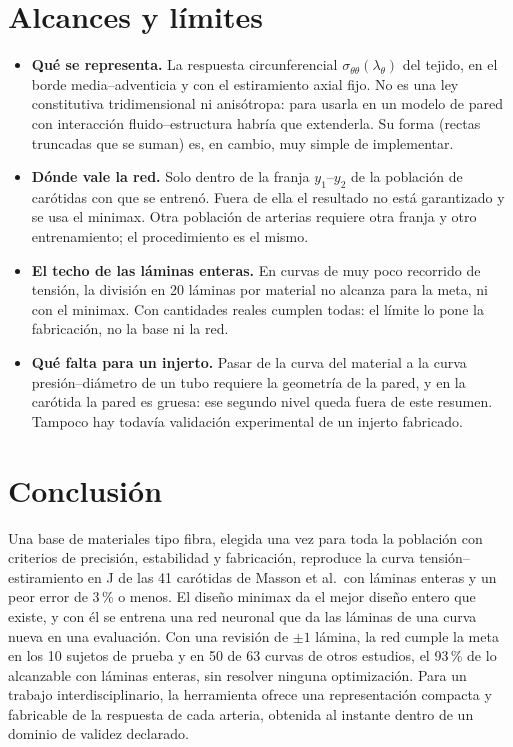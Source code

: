\section{Alcances y límites}
\begin{itemize}
\item \textbf{Qué se representa.} La respuesta circunferencial $\sigma_{\theta\theta}(\lambda_\theta)$ del tejido, en el borde media--adventicia y con el estiramiento axial fijo. No es una ley constitutiva tridimensional ni anisótropa: para usarla en un modelo de pared con interacción fluido--estructura habría que extenderla. Su forma (rectas truncadas que se suman) es, en cambio, muy simple de implementar.
\item \textbf{Dónde vale la red.} Solo dentro de la franja $y_1$--$y_2$ de la población de carótidas con que se entrenó. Fuera de ella el resultado no está garantizado y se usa el minimax. Otra población de arterias requiere otra franja y otro entrenamiento; el procedimiento es el mismo.
\item \textbf{El techo de las láminas enteras.} En curvas de muy poco recorrido de tensión, la división en 20 láminas por material no alcanza para la meta, ni con el minimax. Con cantidades reales cumplen todas: el límite lo pone la fabricación, no la base ni la red.
\item \textbf{Qué falta para un injerto.} Pasar de la curva del material a la curva presión--diámetro de un tubo requiere la geometría de la pared, y en la carótida la pared es gruesa: ese segundo nivel queda fuera de este resumen. Tampoco hay todavía validación experimental de un injerto fabricado.
\end{itemize}

\section{Conclusión}
Una base de materiales tipo fibra, elegida una vez para toda la población con criterios de precisión, estabilidad y fabricación, reproduce la curva tensión--estiramiento en J de las 41 carótidas de Masson et al.\ con láminas enteras y un peor error de 3\,\% o menos. El diseño minimax da el mejor diseño entero que existe, y con él se entrena una red neuronal que da las láminas de una curva nueva en una evaluación. Con una revisión de $\pm1$ lámina, la red cumple la meta en los 10 sujetos de prueba y en 50 de 63 curvas de otros estudios, el 93\,\% de lo alcanzable con láminas enteras, sin resolver ninguna optimización. Para un trabajo interdisciplinario, la herramienta ofrece una representación compacta y fabricable de la respuesta de cada arteria, obtenida al instante dentro de un dominio de validez declarado.


